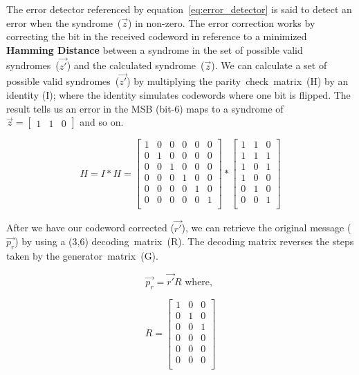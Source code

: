 \documentclass[12pt]{article}
\begin{document}
The error detector referenced by equation~\ref{eq:error_detector} is said to 
detect an error when the syndrome~($\vec{z}$) in non-zero.
The error correction works by correcting the bit in the received codeword in 
reference to a minimized \textbf{Hamming Distance} between a syndrome in the
set of possible valid syndromes~($\vec{z'}$) and the calculated 
syndrome~($\vec{z}$). We can calculate a set of possible valid 
syndromes~($\vec{z'}$) by multiplying the parity~check~matrix~(H) by an
identity (I); where the identity simulates codewords where one bit is flipped.
The result tells us an error in the MSB (bit-6) maps to a syndrome of 
$\vec{z}=\begin{bmatrix} 1 & 1 & 0 \end{bmatrix}$ and so on.

$$
    H=I*H=
    \begin{bmatrix}
        1 & 0 & 0 & 0 & 0 & 0 \\
        0 & 1 & 0 & 0 & 0 & 0 \\
        0 & 0 & 1 & 0 & 0 & 0 \\
        0 & 0 & 0 & 1 & 0 & 0 \\
        0 & 0 & 0 & 0 & 1 & 0 \\
        0 & 0 & 0 & 0 & 0 & 1 \\
    \end{bmatrix}
    *
    \begin{bmatrix}
        1 & 1 & 0 \\
        1 & 1 & 1 \\
        1 & 0 & 1 \\
        1 & 0 & 0 \\
        0 & 1 & 0 \\
        0 & 0 & 1 \\
    \end{bmatrix}
$$

After we have our codeword corrected ($\vec{r'}$), we can retrieve the 
original message ($\vec{p_r}$) by using a (3,6) decoding~matrix~(R). 
The decoding matrix reverses the steps taken by the generator~matrix~(G). 

\begin{equation}
    \vec{p_r}=\vec{r'}R \text{ where, }
    \label{eq:decoder}   
\end{equation}

$$
    R=
    \begin{bmatrix}
        1 & 0 & 0 \\
        0 & 1 & 0 \\
        0 & 0 & 1 \\
        0 & 0 & 0 \\
        0 & 0 & 0 \\
        0 & 0 & 0 \\
    \end{bmatrix}
$$
\end{document}

